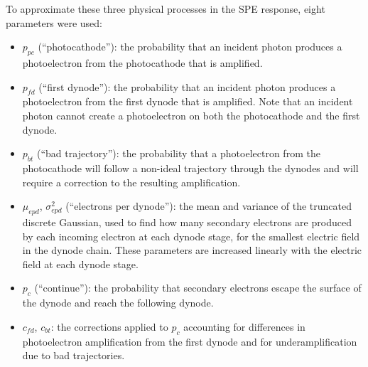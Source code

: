 \documentclass[11pt,a4paper]{article}
\begin{document}
To approximate these three physical processes in the SPE response, eight parameters were used:

\begin{itemize}
    \item $p_{pc}$ (``photocathode''): the probability that an incident photon produces a photoelectron from the photocathode that is amplified.
    \item $p_{fd}$ (``first dynode''): the probability that an incident photon produces a photoelectron from the first dynode that is amplified.  Note that an incident photon cannot create a photoelectron on both the photocathode and the first dynode.
    \item $p_{bt}$ (``bad trajectory''): the probability that a photoelectron from the photocathode will follow a non-ideal trajectory through the dynodes and will require a correction to the resulting amplification.
    \item $\mu_{epd}$, $\sigma_{epd}^2$ (``electrons per dynode''): the mean and variance of the truncated discrete Gaussian, used to find how many secondary electrons are produced by each incoming electron at each dynode stage, for the smallest electric field in the dynode chain.  These parameters are increased linearly with the electric field at each dynode stage.
    \item $p_c$ (``continue''): the probability that secondary electrons escape the surface of the dynode and reach the following dynode.
    \item $c_{fd}$, $c_{bt}$: the corrections applied to $p_c$ accounting for differences in photoelectron amplification from the first dynode and for underamplification due to bad trajectories.


    
\end{itemize}

\end{document}
